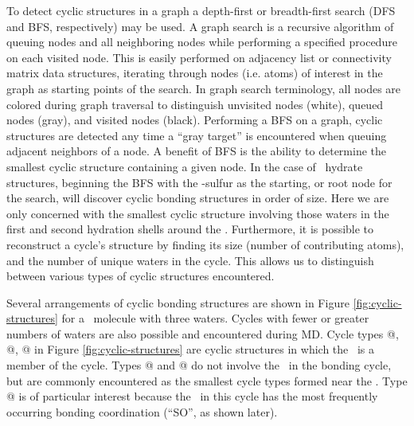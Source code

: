 \documentclass{article}
\makeatletter
\newcommand{\Rmnum}[1]{\expandafter\@slowromancap\romannumeral #1@}
\makeatother
\begin{document}
To detect cyclic structures in a graph a depth-first or breadth-first search (DFS and BFS, respectively) may be used.\cite{Knuth1997, Cormen 2001} A graph search is a recursive algorithm of queuing nodes and all neighboring nodes while performing a specified procedure on each visited node. This is easily performed on adjacency list or connectivity matrix data structures, iterating through nodes (i.e. atoms) of interest in the graph as starting points of the search. In graph search terminology, all nodes are colored during graph traversal to distinguish unvisited nodes (white), queued nodes (gray), and visited nodes (black). Performing a BFS on a graph, cyclic structures are detected any time a ``gray target'' is encountered when queuing adjacent neighbors of a node. A benefit of BFS is the ability to determine the smallest cyclic structure containing a given node. In the case of \suldiox~hydrate structures, beginning the BFS with the \suldiox-sulfur as the starting, or root node for the search, will discover cyclic bonding structures in order of size. Here we are only concerned with the smallest cyclic structure involving those waters in the first and second hydration shells around the \suldiox. Furthermore, it is possible to reconstruct a cycle's structure by finding its size (number of contributing atoms), and the number of unique waters in the cycle. This allows us to distinguish between various types of cyclic structures encountered.

Several arrangements of cyclic bonding structures are shown in Figure \ref{fig:cyclic-structures} for a \suldiox~molecule with three waters. Cycles with fewer or greater numbers of waters are also possible and encountered during MD. Cycle types \Rmnum{1}, \Rmnum{2}, \Rmnum{3} in Figure \ref{fig:cyclic-structures} are cyclic structures in which the \suldiox~is a member of the cycle. Types \Rmnum{4} and \Rmnum{5} do not involve the \suldiox~in the bonding cycle, but are commonly encountered as the smallest cycle types formed near the \suldiox. Type \Rmnum{3} is of particular interest because the \suldiox~in this cycle has the most frequently occurring bonding coordination (``SO'', as shown later).
\end{document}
